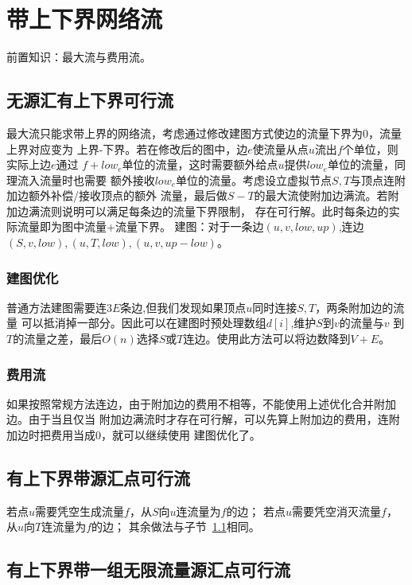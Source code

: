 \section{带上下界网络流}
前置知识：最大流与费用流。
\subsection{无源汇有上下界可行流}\label{LFA}
最大流只能求带上界的网络流，考虑通过修改建图方式使边的流量下界为0，流量上界对应变为
上界-下界。若在修改后的图中，边$e$使流量从点$u$流出$f$个单位，则实际上边$e$通过
$f+low_e$单位的流量，这时需要额外给点$u$提供$low_e$单位的流量，同理流入流量时也需要
额外接收$low_e$单位的流量。考虑设立虚拟节点$S,T$与顶点连附加边额外补偿/接收顶点的额外
流量，最后做$S-T$的最大流使附加边满流。若附加边满流则说明可以满足每条边的流量下界限制，
存在可行解。此时每条边的实际流量即为图中流量+流量下界。
建图：对于一条边$(u,v,low,up)$,连边$(S,v,low),(u,T,low),(u,v,up-low)$。

\subsubsection{建图优化}

普通方法建图需要连$3E$条边,但我们发现如果顶点$u$同时连接$S,T$，两条附加边的流量
可以抵消掉一部分。因此可以在建图时预处理数组$d[i]$,维护$S$到$v$的流量与$v$
到$T$的流量之差，最后$O(n)$选择$S$或$T$连边。使用此方法可以将边数降到$V+E$。

\subsubsection{费用流}

如果按照常规方法连边，由于附加边的费用不相等，不能使用上述优化合并附加边。由于当且仅当
附加边满流时才存在可行解，可以先算上附加边的费用，连附加边时把费用当成0，就可以继续使用
建图优化了。

\subsection{有上下界带源汇点可行流}

若点$u$需要凭空生成流量$f$，从$S$向$u$连流量为$f$的边；
若点$u$需要凭空消灭流量$f$，从$u$向$T$连流量为$f$的边；
其余做法与子节~\ref{LFA}相同。

\subsection{有上下界带一组无限流量源汇点可行流}

